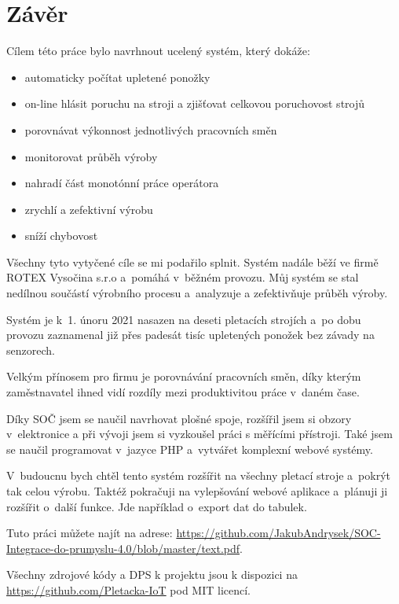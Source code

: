 \chapter*{Závěr}

Cílem této práce bylo navrhnout ucelený systém, který dokáže:

\begin{itemize}
    \item automaticky počítat upletené ponožky
    \item on-line hlásit poruchu na stroji a zjišťovat celkovou poruchovost strojů
    \item porovnávat výkonnost jednotlivých pracovních směn
    \item monitorovat průběh výroby
    \item nahradí část monotónní práce operátora
    \item zrychlí a zefektivní výrobu
    \item sníží chybovost
\end{itemize}

Všechny tyto vytyčené cíle se mi podařilo splnit. Systém nadále běží ve firmě ROTEX Vysočina s.r.o \cite{ROTEX} a~pomáhá v~běžném provozu.
Můj systém se stal nedílnou součástí výrobního procesu a analyzuje a zefektivňuje průběh výroby.

Systém je k 1. únoru 2021 nasazen na deseti pletacích strojích a po dobu provozu zaznamenal již přes padesát tisíc upletených ponožek bez závady na senzorech.

Velkým přínosem pro firmu je porovnávání pracovních směn, díky kterým zaměstnavatel ihned vidí rozdíly mezi produktivitou práce v~daném čase.

Díky SOČ jsem se naučil navrhovat plošné spoje, rozšířil jsem si obzory v~elektronice a při vývoji jsem si vyzkoušel práci s měřícími přístroji. 
Také jsem se naučil programovat v~jazyce PHP a~vytvářet komplexní webové systémy.

V~budoucnu bych chtěl tento systém rozšířit na všechny pletací stroje a~pokrýt tak celou výrobu.
Taktéž pokračuji na vylepšování webové aplikace a~plánuji ji rozšířit o~další funkce.
Jde například o~export dat do tabulek.

Tuto práci můžete najít na adrese: \url{https://github.com/JakubAndrysek/SOC-Integrace-do-prumyslu-4.0/blob/master/text.pdf}.

Všechny zdrojové kódy a DPS k projektu jsou k dispozici na \url{https://github.com/Pletacka-IoT} pod MIT licencí.

